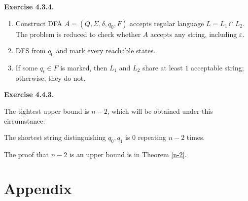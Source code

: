 \documentclass[a4paper]{article}
\newenvironment{exercise}[1]{
	\par
	\noindent\textbf{Exercise #1.}\quad
}{
	\par
	\bigskip
}
\begin{document}
\begin{exercise}{4.3.4}\hspace{0pt}\\
    \begin{enumerate}
        \item Construct DFA $A=(Q,\Sigma,\delta,q_0,F)$ accepts
            regular language $L=L_1\cap L_2$.
            The problem is reduced to check whether $A$ accepts any string, including $\varepsilon$. 
        \item DFS from $q_0$ and mark every reachable states.
        \item If some $q_t\in F$ is marked, then $L_1$ and $L_2$ share at least $1$ 
            acceptable string; otherwise, they do not.
    \end{enumerate}
\end{exercise}

\begin{exercise}{4.4.3} 
    The tightest upper bound is $n-2$, which will be obtained under this circumstance:
    \begin{center}
    \end{center}
    The shortest string distinguishing $q_0,q_1$ is $0$ repeating $n-2$ times.\par
    The proof that $n-2$ is an upper bound is in Theorem \ref{n-2}.
\end{exercise}


\newpage
\section*{Appendix}
\end{document}

